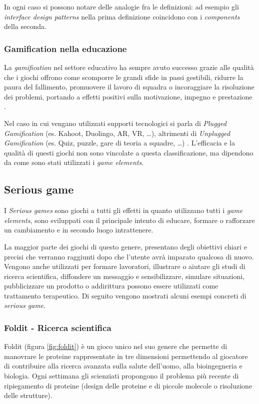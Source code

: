In ogni caso si possono notare delle analogie fra le definizioni: ad esempio gli \textit{interface design patterns} nella prima definizione coincidono con i \textit{components} della seconda.

\subsubsection{Gamification nella educazione}
La \textit{gamification} nel settore educativo ha sempre avuto successo grazie alle qualità che i giochi offrono come scomporre le grandi sfide in passi gestibili, ridurre la paura del fallimento, promuovere il lavoro di squadra o incoraggiare la risoluzione dei problemi, portando a effetti positivi sulla motivazione, impegno e prestazione \cite{gamifEducation}.

Nel caso in cui vengano utilizzati supporti tecnologici si parla di \textit{Plugged Gamification} (es. Kahoot, Duolingo, AR, VR, \dots), altrimenti di \textit{Unplugged Gamification} (es. Quiz, puzzle, gare di teoria a squadre, \dots) \cite{gamificInEducation}. L'efficacia e la qualità di questi giochi non sono vincolate a questa classificazione, ma dipendono da come sono stati utilizzati i \textit{game elements}.

%
%
\subsection{Serious game}
I \textit{Serious games} sono giochi a tutti gli effetti in quanto utilizzano tutti i \textit{game elements}, sono sviluppati con il principale intento di educare, formare o rafforzare un cambiamento e in secondo luogo intrattenere.

La maggior parte dei giochi di questo genere, presentano degli obiettivi chiari e precisi che verranno raggiunti dopo che l'utente avrà imparato qualcosa di nuovo.
Vengono anche utilizzati per formare lavoratori, illustrare o aiutare gli studi di ricerca scientifica, diffondere un messaggio e sensibilizzare, simulare situazioni, pubblicizzare un prodotto o addirittura possono essere utilizzati come trattamento terapeutico.
Di seguito vengono mostrati alcuni esempi concreti di \textit{serious game}.

\subsubsection{Foldit - Ricerca scientifica}
Foldit \cite{foldit} (figura \ref{fig:foldit}) è un gioco unico nel suo genere che permette di manovrare le proteine rappresentate in tre dimensioni permettendo al giocatore di contribuire alla ricerca avanzata sulla salute dell'uomo, alla bioingegneria e biologia. Ogni settimana gli scienziati propongono il problema più recente di ripiegamento di proteine (design delle proteine e di piccole molecole o risoluzione delle strutture).

